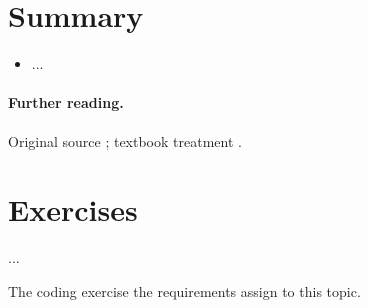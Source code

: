 \section{Summary}
\begin{summary}
\begin{itemize}
  \item ...
\end{itemize}
\end{summary}

\paragraph{Further reading.}
Original source \cite{key}; textbook treatment \cite{key}.

\section{Exercises}
\label{sec:chNN-exercises}
\begin{exercise}[\difficulty{1}]
\label{exr:chNN-slug}
...
\end{exercise}
\begin{exercise}
\label{exr:chNN-coding}
The coding exercise the requirements assign to this topic.
\end{exercise}
